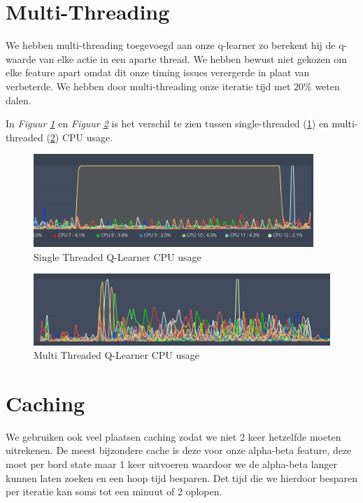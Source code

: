 \documentclass[a4paper,openany]{uantwerpenassignment}
\newcommand{\figref}[1]{\textit{Figuur \ref{#1}}}
\begin{document}
\section{Multi-Threading}

We hebben multi-threading toegevoegd aan onze q-learner zo berekent hij de q-waarde van elke actie in een aparte thread. We hebben bewust niet gekozen om elke feature apart omdat dit onze timing issues verergerde in plaat van verbeterde. We hebben door multi-threading onze iteratie tijd met $20\%$ weten dalen.

In \figref{fig:singlethreaded} en \figref{fig:multithreaded} is het verschil te zien tussen single-threaded \tiny(\ref{fig:singlethreaded})\small{ }en multi-threaded \tiny(\ref{fig:multithreaded})\small{ }CPU usage.

\begin{figure}[h]
    \centering
    \includegraphics[width=300pt]{images/singlethreaded.png}
    \caption{Single Threaded Q-Learner CPU usage}
    \label{fig:singlethreaded}
\end{figure}

\begin{figure}[h]
    \centering
    \includegraphics[width=350pt]{images/multithreaded.png}
    \caption{Multi Threaded Q-Learner CPU usage}
    \label{fig:multithreaded}
\end{figure}

\section{Caching}
\label{caching}

We gebruiken ook veel plaatsen caching zodat we niet 2 keer hetzelfde moeten uitrekenen. De meest bijzondere cache is deze voor onze alpha-beta feature, deze moet per bord state maar 1 keer uitvoeren waardoor we de alpha-beta langer kunnen laten zoeken en een hoop tijd besparen.
Det tijd die we hierdoor besparen per iteratie kan soms tot een minuut of 2 oplopen.
\end{document}
